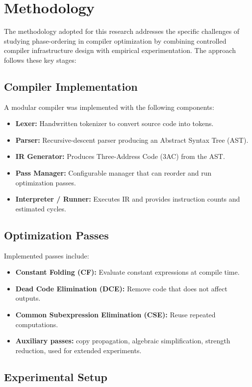 \documentclass[conference]{IEEEtran}
\begin{document}
\section{Methodology}
The methodology adopted for this research addresses the specific challenges of studying phase-ordering in compiler optimization by combining controlled compiler infrastructure design with empirical experimentation. The approach follows these key stages:

\subsection{Compiler Implementation}
A modular compiler was implemented with the following components:
\begin{itemize}
    \item \textbf{Lexer:} Handwritten tokenizer to convert source code into tokens.
    \item \textbf{Parser:} Recursive-descent parser producing an Abstract Syntax Tree (AST).
    \item \textbf{IR Generator:} Produces Three-Address Code (3AC) from the AST.
    \item \textbf{Pass Manager:} Configurable manager that can reorder and run optimization passes.
    \item \textbf{Interpreter / Runner:} Executes IR and provides instruction counts and estimated cycles.
\end{itemize}

\subsection{Optimization Passes}
Implemented passes include:
\begin{itemize}
    \item \textbf{Constant Folding (CF):} Evaluate constant expressions at compile time.
    \item \textbf{Dead Code Elimination (DCE):} Remove code that does not affect outputs.
    \item \textbf{Common Subexpression Elimination (CSE):} Reuse repeated computations.
    \item \textbf{Auxiliary passes:} copy propagation, algebraic simplification, strength reduction, used for extended experiments.
\end{itemize}

\subsection{Experimental Setup}
\end{document}
